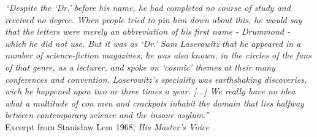 \newpage

\vspace*{5cm}



\textit{``Despite the `Dr.' before his name, he had completed no course of study and received no degree. When people tried to pin him down about this, he would say that the letters were merely an abbreviation of his first name - Drummond - which he did not use. But it was as `Dr.' Sam Laserowitz that he appeared in a number of science-fiction magazines; he was also known, in the circles of the fans of that genre, as a lecturer, and spoke on `cosmic' themes at their many conferences and convention. Laserowitz's speciality was earthshaking discoveries, wich he happened upon two or three times a year. [...] We really have no idea what a multitude of con men and crackpots inhabit the domain that lies halfway between contemporary science and the insane asylum.''}\\

\noindent Excerpt from Stanis\l aw Lem 1968, \textit{His Master's Voice} \citep[p.~38]{Lem1984}.



\vspace{2cm}

